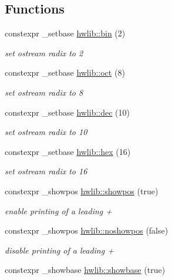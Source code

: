 \subsection*{Functions}
\begin{DoxyCompactItemize}
\item 
constexpr \+\_\+setbase \hyperlink{namespacehwlib_a2f624a643c9c8d30b5e4f3dca914e28e}{hwlib\+::bin} (2)
\begin{DoxyCompactList}\small\item\em set ostream radix to 2 \end{DoxyCompactList}\item 
constexpr \+\_\+setbase \hyperlink{namespacehwlib_a9711974fb746e16a55e130b461cad619}{hwlib\+::oct} (8)
\begin{DoxyCompactList}\small\item\em set ostream radix to 8 \end{DoxyCompactList}\item 
constexpr \+\_\+setbase \hyperlink{namespacehwlib_ab8f3a2357c88d53861c09dbd17f14f1b}{hwlib\+::dec} (10)
\begin{DoxyCompactList}\small\item\em set ostream radix to 10 \end{DoxyCompactList}\item 
constexpr \+\_\+setbase \hyperlink{namespacehwlib_a4726c8f4bef5591b6f6853041328a04f}{hwlib\+::hex} (16)
\begin{DoxyCompactList}\small\item\em set ostream radix to 16 \end{DoxyCompactList}\item 
constexpr \+\_\+showpos \hyperlink{namespacehwlib_a7bb9927f52011b4cc4a90b03e98f95fd}{hwlib\+::showpos} (true)
\begin{DoxyCompactList}\small\item\em enable printing of a leading \textquotesingle{}+\textquotesingle{} \end{DoxyCompactList}\item 
constexpr \+\_\+showpos \hyperlink{namespacehwlib_accdd72e1358d667a9458767d886b2a53}{hwlib\+::noshowpos} (false)
\begin{DoxyCompactList}\small\item\em disable printing of a leading \textquotesingle{}+\textquotesingle{} \end{DoxyCompactList}\item 
constexpr \+\_\+showbase \hyperlink{namespacehwlib_a84adb21b2d054d3b70c6b26af5f44566}{hwlib\+::showbase} (true)

\end{DoxyCompactItemize}
